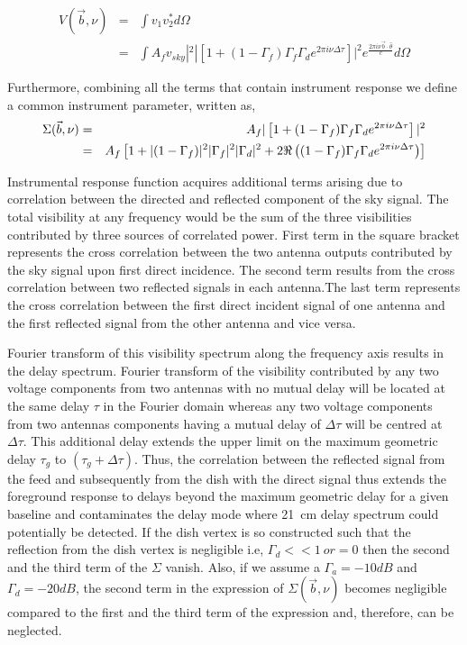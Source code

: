 \documentclass[12pt,preprint]{aastex}
\newcommand{\volt}{{v}}
\newcommand{\vis}{{V}}
\newcommand{\bm}{{A}}
\newcommand{\thhat}{{\hat\theta}}
\newcommand{\fngexp}{{e^{\frac{2\pi i\nu\vec{b}\cdot\thhat}{c}}}}
\newcommand{\dfngexp}{{e^{2\pi i\nu \Delta \tau}}}
\begin{document}
\begin{eqnarray}
\vis(\vec b, \nu) & = & \int \volt_{1}\volt_{2}^{*} d\Omega \nonumber\\
		        & = & \int \bm_{f} \volt_{sky}|^{2} |\left [ 1+(1-\Gamma_{f}) \Gamma_{f} \Gamma_{d} \dfngexp  \right]|^{2} \fngexp  d\Omega
\label{eq6}		        
\end{eqnarray}


 Furthermore, combining all the terms that contain instrument response we define a common instrument parameter, written as, 
\begin{eqnarray}
\Sigma(\vec b, \nu) & = & \bm_{f} |\left [ 1+ (1-\Gamma_{f}) \Gamma_{f} \Gamma_{d} e^{2\pi i\nu \Delta \tau} \right]|^{2}\nonumber\\
 	    & = &  \bm_{f}  \left[ 1+ |(1-\Gamma_{f})|^{2}|\Gamma_{f}|^{2}|\Gamma_{d}|^{2} + 2 \Re \left ( (1-\Gamma_{f})\Gamma_{f}\Gamma_{d} \dfngexp \right) \right] 
\label{eq{7}}	    
\end{eqnarray} 

Instrumental response function acquires additional terms arising due to correlation between the directed and reflected component of the sky signal. The total visibility at any frequency would be the sum of the three visibilities contributed by three sources of correlated power. First term in the square bracket represents the cross correlation between the two antenna outputs contributed by the sky signal upon first direct incidence. The second term results from the cross correlation between two reflected signals in each antenna.The last term represents the cross correlation between the first direct incident signal of one antenna and the first reflected signal from the other antenna and vice versa.

Fourier transform of this visibility spectrum along the frequency axis results in the delay spectrum. 
 Fourier transform of the visibility contributed by any two voltage components from two antennas with no mutual delay will be located at the same delay $\tau $ in the Fourier domain whereas any two voltage components from two antennas components having a mutual delay of $\Delta \tau$ will be centred at $\Delta \tau$. This additional delay extends the upper limit on the maximum geometric delay $\tau_{g}$ to $(\tau_{g}+\Delta \tau)$.
 Thus, the correlation between the reflected signal  from the feed and subsequently from the dish with the direct signal thus extends the foreground response to delays beyond the maximum geometric delay for a given baseline and contaminates the delay mode where 21~cm delay spectrum could potentially be detected. If the dish vertex is so constructed such that the reflection from the dish vertex is negligible i.e, $\Gamma_{d}<<1\ or = 0$ then the second and the third term of the $\Sigma$ vanish. Also, if we assume a $\Gamma_{a} =-10dB$ and $\Gamma_{d}= -20dB$, the second term in the expression of $\Sigma(\vec b, \nu)$ becomes negligible compared to the first and the third term of the expression and, therefore, can be neglected. \\
\end{document}
